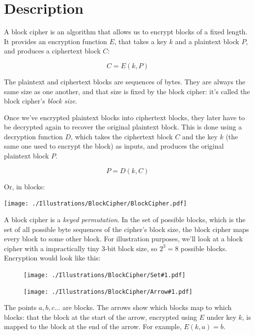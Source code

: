 \documentclass[11pt,ebook,table,dvipsnames]{memoir}
\begin{document}
\section{Description}
\label{sec-2-2-1}
A \gls{block cipher} is an algorithm that allows us to encrypt blocks
of a fixed length. It provides an encryption function $E$, that takes
a key $k$ and a plaintext block $P$, and produces a ciphertext block
$C$:

\begin{equation}
C = E(k, P)
\end{equation}

The plaintext and ciphertext blocks are sequences of bytes. They are
always the same size as one another, and that size is fixed by the
block cipher: it's called the block cipher's \emph{block size}.

Once we've encrypted plaintext blocks into ciphertext blocks, they
later have to be decrypted again to recover the original plaintext
block. This is done using a decryption function $D$, which takes the
ciphertext block $C$ and the key $k$ (the same one used to encrypt the
block) as inputs, and produces the original plaintext block $P$.

\begin{equation}
P = D(k, C)
\end{equation}

Or, in blocks:

\texttt{[image: ./Illustrations/BlockCipher/BlockCipher.pdf]}

\newcommand{\permutationimg}[1] {
\begin{figure}[ht!]
  \centering
  \texttt{[image: ./Illustrations/BlockCipher/Set\#1.pdf]}

  \texttt{[image: ./Illustrations/BlockCipher/Arrow\#1.pdf]}
\end{figure}
}

A block cipher is a \emph{keyed permutation}. In the set of possible
blocks, which is the set of all possible byte sequences of the
cipher's block size, the block cipher maps every block to some other
block. For illustration purposes, we'll look at a block cipher with a
impractically tiny 3-bit block size, so $2^3 = 8$ possible blocks.
Encryption would look like this:

\permutationimg{Ek}

The points $a, b, c\ldots$ are blocks. The arrows show which blocks
map to which blocks: that the block at the start of the arrow,
encrypted using $E$ under key $k$, is mapped to the block at the end
of the arrow. For example, $E(k, a) = b$.
\end{document}
